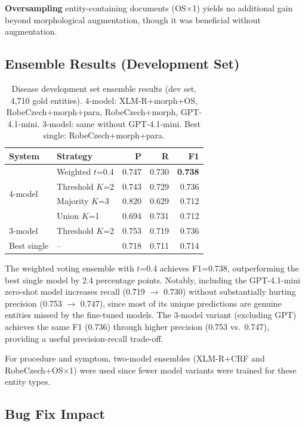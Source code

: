 \documentclass[11pt]{article}
\begin{document}
\textbf{Oversampling} entity-containing documents (OS$\times$1) yields no additional gain
beyond morphological augmentation, though it was beneficial without augmentation.

\subsection{Ensemble Results (Development Set)}

\begin{table}[h]
\centering
\small
\begin{tabular}{llrrr}
\toprule
\textbf{System} & \textbf{Strategy} & \textbf{P} & \textbf{R} & \textbf{F1} \\
\midrule
\multirow{4}{*}{4-model}
  & Weighted $t$=0.4  & 0.747 & 0.730 & \textbf{0.738} \\
  & Threshold $K$=2   & 0.743 & 0.729 & 0.736 \\
  & Majority $K$=3    & 0.820 & 0.629 & 0.712 \\
  & Union $K$=1       & 0.694 & 0.731 & 0.712 \\
\midrule
3-model & Threshold $K$=2  & 0.753 & 0.719 & 0.736 \\
\midrule
Best single      & {--}             & 0.718 & 0.711 & 0.714 \\
\bottomrule
\end{tabular}
\caption{Disease development set ensemble results (dev set, 4,710 gold entities).
4-model: XLM-R+morph+OS, RobeCzech+morph+para, RobeCzech+morph, GPT-4.1-mini.
3-model: same without GPT-4.1-mini. Best single: RobeCzech+morph+para.}
\label{tab:ensemble}
\end{table}

The weighted voting ensemble with $t$=0.4 achieves F1=0.738, outperforming the best
single model by 2.4 percentage points. Notably, including the GPT-4.1-mini zero-shot
model increases recall (0.719 $\to$ 0.730) without substantially hurting precision (0.753 $\to$ 0.747),
since most of its unique predictions are genuine entities missed by the fine-tuned models.
The 3-model variant (excluding GPT) achieves the same F1 (0.736) through higher precision
(0.753 vs.\ 0.747), providing a useful precision-recall trade-off.

For procedure and symptom, two-model ensembles (XLM-R+CRF and RobeCzech+OS$\times$1)
were used since fewer model variants were trained for these entity types.

\subsection{Bug Fix Impact}
\end{document}
